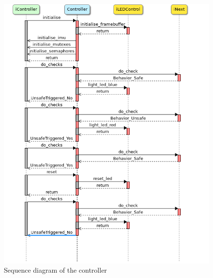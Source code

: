 \documentclass[12pt]{scrreprt}
\begin{document}
\begin{figure}[H]
    \centering
    \includegraphics[width=\textwidth]{Figures/results/modelling_figures/Controller/Controller_seq.png}
    \caption{Sequence diagram of the controller}
    \label{fig:controller_seq}
\end{figure}
\end{document}
